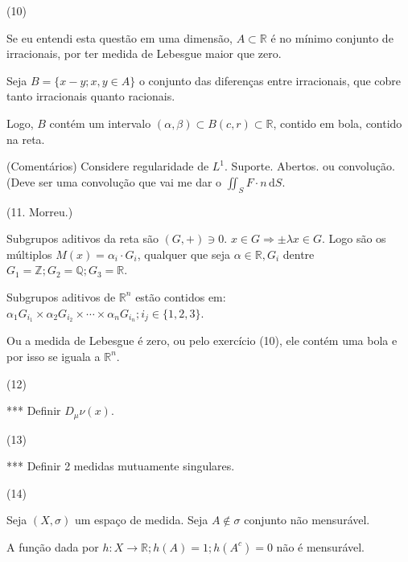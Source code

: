 \documentclass[12pt]{article}
\begin{document}
(10)

Se eu entendi esta quest\~ao em uma dimens\~ao, $A \subset \mathbb{R}$ \'e no m\'inimo conjunto de irracionais, por ter medida de Lebesgue maior que zero.

Seja $B = \{ x - y ; x,y \in A \}$ o conjunto das diferen\c{c}as entre irracionais, que cobre tanto irracionais quanto racionais.

Logo, $B$ cont\'em um intervalo $(\alpha, \beta) \subset B(c, r) \subset \mathbb{R}$, contido em bola, contido na reta.

\vspace{3mm}

(Coment\'arios) Considere regularidade de $L^1$. Suporte. Abertos. ou convolu\c{c}\~ao. (Deve ser uma convolu\c{c}\~ao que vai me dar o $\iint_S F\cdot n\,\mathrm{d}S$.

\vspace{3mm}

(11. Morreu.)

Subgrupos aditivos da reta s\~ao $(G,+) \ni 0$. $x \in G \Rightarrow \pm \lambda x \in G$. Logo s\~ao os m\'ultiplos $M(x) = \alpha_i \cdot G_i$, qualquer que seja $\alpha \in \mathbb{R}, G_i$ dentre $G_1 = \mathbb{Z} ; G_2 = \mathbb{Q} ; G_3 = \mathbb{R}$.

Subgrupos aditivos de $\mathbb{R}^n$ est\~ao contidos em: $\alpha_1 G_{i_1} \times \alpha_2 G_{i_2} \times \cdots \times \alpha_n G_{i_n} ; i_j \in \{ 1, 2, 3 \}$.

\vspace{3mm}

Ou a medida de Lebesgue \'e zero, ou pelo exerc\'icio (10), ele cont\'em uma bola e por isso se iguala a $\mathbb{R}^n$.

\vspace{3mm}

(12)

*** Definir $D_{\mu} \nu(x)$.

\vspace{3mm}

(13)

*** Definir 2 medidas mutuamente singulares.

\vspace{3mm}

(14)

Seja $(X, \sigma)$ um espa\c{c}o de medida. Seja $A \notin \sigma$ conjunto n\~ao mensur\'avel.

A fun\c{c}\~ao dada por $h : X \to \mathbb{R} ; h(A) = 1 ; h(A^c) = 0$ n\~ao \'e mensur\'avel.
\end{document}
